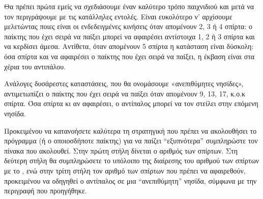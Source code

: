 \documentclass[a4paper,11pt,oneside]{book}
\begin{document}
\begin{step}
Θα πρέπει πρώτα εμείς να σχεδιάσουμε έναν καλύτερο τρόπο παιχνιδιού και μετά να τον περιγράψουμε με τις κατάλληλες εντολές.
Είναι ευκολότερο ν' αρχίσουμε μελετώντας ποιες είναι οι ενδεδειγμένες κινήσεις όταν απομένουν 2, 3 ή 4 σπίρτα: ο παίκτης που έχει σειρά να παίξει μπορεί να αφαιρέσει αντίστοιχα 1, 2 ή 3 σπίρτα και να κερδίσει άμεσα. Αντίθετα, όταν απομένουν 5 σπίρτα η κατάσταση είναι δύσκολη: όσα σπίρτα και να αφαιρέσει ο παίκτης που έχει σειρά να παίξει, η έκβαση είναι στα χέρια του αντιπάλου. 

Ανάλογες δυσάρεστες καταστάσεις, που θα ονομάσουμε «ανεπιθύμητες νησίδες», αντιμετωπίζει ο παίκτης που έχει σειρά να παίξει όταν απομένουν 9, 13, 17, κ.ο.κ σπίρτα. Όσα σπίρτα κι αν αφαιρέσει, ο αντίπαλος μπορεί να τον στείλει στην επόμενη νησίδα.

Προκειμένου να κατανοήσετε καλύτερα τη στρατηγική που πρέπει να ακολουθήσει το πρόγραμμα (ή ο οποιοσδήποτε παίκτης) για να παίζει ``εξυπνότερα'' συμπληρώστε τον πίνακα που ακολουθεί. Στην πρώτη στήλη δίνεται ο αριθμός των σπίρτων. Στη δεύτερη στήλη θα συμπληρώσετε το υπόλοιπο της διαίρεσης του αριθμού των σπίρτων με το , ενώ στην τρίτη στήλη τον αριθμό των σπίρτων που πρέπει να αφαιρεθούν, προκειμένου να οδηγηθεί ο αντίπαλος σε μια ``ανεπιθύμητη'' νησίδα, σύμφωνα με την περιγραφή που προηγήθηκε.


\end{step}
\end{document}

